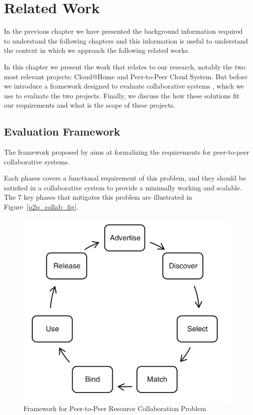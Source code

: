 \documentclass[12pt, titlepage]{uo_temp}
\begin{document}
     \chapter{Related Work}\label{rel_work}
     In the previous chapter we have presented the background information required to
     understand the following chapters and this information is useful to understand the
     context in which we approach the following related works.

     In this chapter we present the work that relates to our research, notably the two
     most relevant projects: Cloud@Home and Peer-to-Peer Cloud System. But before we
     introduce a framework designed to evaluate collaborative systems \cite{p2p_collab},
     which we use to evaluate the two projects. Finally, we discuss the how these
     solutions fit our requirements and what is the scope of these projects.
     
     \section{Evaluation Framework}\label{rel_EvalFramework}
     The framework proposed by \cite{p2p_collab} aims at formalizing the requirements for
     peer-to-peer collaborative systems.

     Each phases covers a functional requirement of this problem, and they should be
     satisfied in a collaborative system to provide a minimally working and scalable. The
     7 key phases that mitigates this problem are illustrated in Figure~\ref{p2p_collab_fig}.
       \begin{figure}[h]
         \centering
         \includegraphics[width=125mm]{images/p2p_collab.jpg}
         \caption{Framework for Peer-to-Peer Resource Collaboration
           Problem\label{p2p_collab_fig)} \cite{p2p_collab}}
       \end{figure}
       
\end{document}
